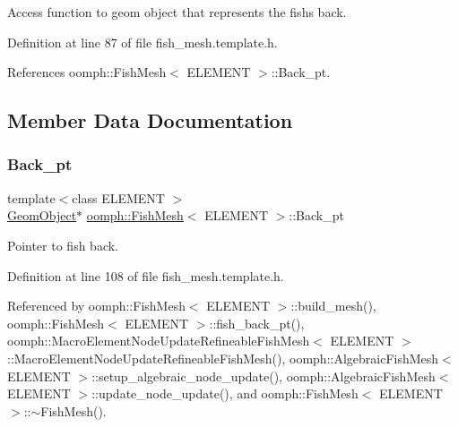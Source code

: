 Access function to geom object that represents the fish\textquotesingle{}s back. 



Definition at line 87 of file fish\+\_\+mesh.\+template.\+h.



References oomph\+::\+Fish\+Mesh$<$ E\+L\+E\+M\+E\+N\+T $>$\+::\+Back\+\_\+pt.



\subsection{Member Data Documentation}
\mbox{\label{classoomph_1_1FishMesh_a26e8eb98c11d6b45cc3b5c5a8e45b530}} 
\subsubsection{\texorpdfstring{Back\+\_\+pt}{Back\_pt}}
{\footnotesize\ttfamily template$<$class E\+L\+E\+M\+E\+NT $>$ \\
\hyperlink{classoomph_1_1GeomObject}{Geom\+Object}$\ast$ \hyperlink{classoomph_1_1FishMesh}{oomph\+::\+Fish\+Mesh}$<$ E\+L\+E\+M\+E\+NT $>$\+::Back\+\_\+pt\hspace{0.3cm}{\ttfamily [protected]}}



Pointer to fish back. 



Definition at line 108 of file fish\+\_\+mesh.\+template.\+h.



Referenced by oomph\+::\+Fish\+Mesh$<$ E\+L\+E\+M\+E\+N\+T $>$\+::build\+\_\+mesh(), oomph\+::\+Fish\+Mesh$<$ E\+L\+E\+M\+E\+N\+T $>$\+::fish\+\_\+back\+\_\+pt(), oomph\+::\+Macro\+Element\+Node\+Update\+Refineable\+Fish\+Mesh$<$ E\+L\+E\+M\+E\+N\+T $>$\+::\+Macro\+Element\+Node\+Update\+Refineable\+Fish\+Mesh(), oomph\+::\+Algebraic\+Fish\+Mesh$<$ E\+L\+E\+M\+E\+N\+T $>$\+::setup\+\_\+algebraic\+\_\+node\+\_\+update(), oomph\+::\+Algebraic\+Fish\+Mesh$<$ E\+L\+E\+M\+E\+N\+T $>$\+::update\+\_\+node\+\_\+update(), and oomph\+::\+Fish\+Mesh$<$ E\+L\+E\+M\+E\+N\+T $>$\+::$\sim$\+Fish\+Mesh().

\mbox{\label{classoomph_1_1FishMesh_ae18c3154ad99054c073840c6b134c49b}} 
